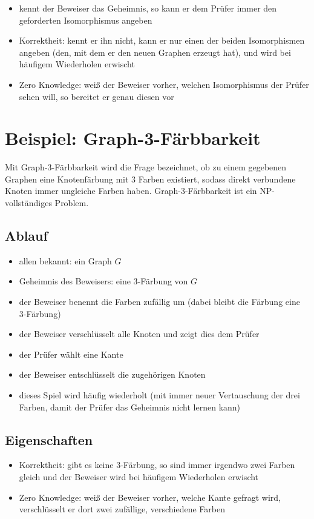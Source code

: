 \documentclass[a4paper,twoside,DIV15,BCOR12mm]{scrbook}
\begin{document}
\begin{itemize}
	\item kennt der Beweiser das Geheimnis, so kann er dem Prüfer immer den geforderten Isomorphismus angeben
	\item Korrektheit: kennt er ihn nicht, kann er nur einen der beiden Isomorphismen angeben (den, mit dem er den neuen Graphen erzeugt hat), und wird bei häufigem Wiederholen erwischt
	\item Zero Knowledge: weiß der Beweiser vorher, welchen Isomorphismus der Prüfer sehen will, so bereitet er genau diesen vor
\end{itemize}

\section{Beispiel: Graph-3-Färbbarkeit}

Mit Graph-3-Färbbarkeit wird die Frage bezeichnet, ob zu einem gegebenen Graphen eine Knotenfärbung mit 3 Farben existiert, sodass direkt verbundene Knoten immer ungleiche Farben haben. Graph-3-Färbbarkeit ist ein NP-vollständiges Problem.

\subsection{Ablauf}

\begin{itemize}
	\item allen bekannt: ein Graph $G$
	\item Geheimnis des Beweisers: eine 3-Färbung von $G$
	\item der Beweiser benennt die Farben zufällig um (dabei bleibt die Färbung eine 3-Färbung)
	\item der Beweiser verschlüsselt alle Knoten und zeigt dies dem Prüfer
	\item der Prüfer wählt eine Kante
	\item der Beweiser entschlüsselt die zugehörigen Knoten
	\item dieses Spiel wird häufig wiederholt (mit immer neuer Vertauschung der drei Farben, damit der Prüfer das Geheimnis nicht lernen kann)
\end{itemize}

\subsection{Eigenschaften}

\begin{itemize}
	\item Korrektheit: gibt es keine 3-Färbung, so sind immer irgendwo zwei Farben gleich und der Beweiser wird bei häufigem Wiederholen erwischt
	\item Zero Knowledge: weiß der Beweiser vorher, welche Kante gefragt wird, verschlüsselt er dort zwei zufällige, verschiedene Farben
\end{itemize}
\end{document}
